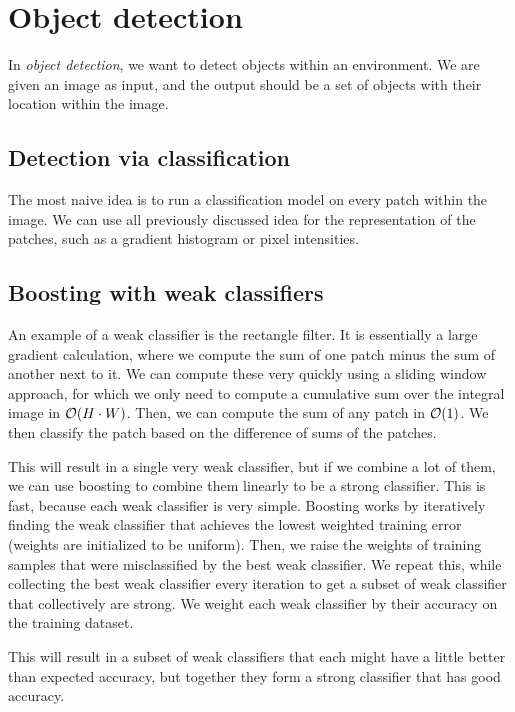 \section{Object detection}

In \textit{object detection}, we want to detect objects within an environment.
We are given an image as input, and the output should be a set of objects with
their location within the image.

\subsection{Detection via classification}

The most naive idea is to run a classification model on every patch within the
image. We can use all previously discussed idea for the representation of the
patches, such as a gradient histogram or pixel intensities.

\subsection{Boosting with weak classifiers}

An example of a weak classifier is the rectangle filter. It is essentially a
large gradient calculation, where we compute the sum of one patch minus the sum
of another next to it. We can compute these very quickly using a sliding window
approach, for which we only need to compute a cumulative sum over the integral
image in $\bigo{H\cdot W}$. Then, we can compute the sum of any patch in
$\bigo{1}$. We then classify the patch based on the difference of sums of the
patches.

This will result in a single very weak classifier, but if we combine a lot of
them, we can use boosting to combine them linearly to be a strong classifier.
This is fast, because each weak classifier is very simple. Boosting works by
iteratively finding the weak classifier that achieves the lowest weighted
training error (weights are initialized to be uniform). Then, we raise the
weights of training samples that were misclassified by the best weak
classifier. We repeat this, while collecting the best weak classifier every
iteration to get a subset of weak classifier that collectively are strong. We
weight each weak classifier by their accuracy on the training dataset.

This will result in a subset of weak classifiers that each might have a little
better than expected accuracy, but together they form a strong classifier that
has good accuracy.

